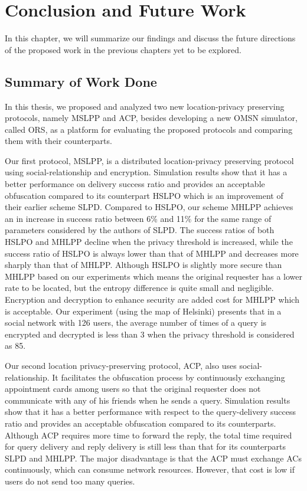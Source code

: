 


\chapter{ Conclusion and Future Work}
\label{CFW}
 

\noindent In this chapter, we will summarize our findings and discuss the future directions of the proposed work in the previous chapters yet to be explored. 


\section{ Summary of Work Done}

\noindent In this thesis, we proposed and analyzed two new location-privacy preserving protocols, namely MSLPP and ACP, besides developing a new OMSN simulator, called ORS, as a platform for evaluating the proposed protocols and comparing them with their counterparts.

\noindent Our first protocol, MSLPP, is a distributed location-privacy preserving protocol using social-relationship and encryption. Simulation results show that it has a better performance on delivery success ratio and provides an acceptable obfuscation compared to its counterpart HSLPO which is an improvement of their earlier scheme SLPD. Compared to HSLPO, our scheme MHLPP achieves an in increase in success ratio between 6\% and 11\% for the same range of parameters considered by the authors of SLPD. The success ratios of both HSLPO and MHLPP decline when the privacy threshold is increased, while the success ratio of HSLPO is always lower than that of MHLPP and decreases more sharply than that of MHLPP. Although HSLPO is slightly more secure than MHLPP based on our experiments which means the original requester has a lower rate to be located, but the entropy difference is quite small and negligible. Encryption and decryption to enhance security are added cost for MHLPP which is acceptable. Our experiment (using the map of Helsinki) presents that in a social network with 126 users, the average number of times of a query is encrypted and decrypted is less than 3 when the privacy threshold is considered as 85.

\noindent Our second location privacy-preserving protocol, ACP, also uses social-relationship. It facilitates the obfuscation process by continuously exchanging appointment cards among users so that the original requester does not communicate with any of his friends when he sends a query. Simulation results show that it has a better performance with respect to the query-delivery success ratio and provides an acceptable obfuscation compared to its counterparts. Although ACP requires more time to forward the reply, the total time required for query delivery and reply delivery is still less than that for its counterparts SLPD and MHLPP. The major disadvantage is that the ACP must exchange ACs continuously, which can consume network resources. However, that cost is low if users do not send too many queries.

